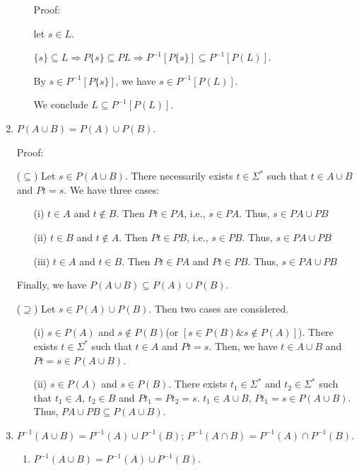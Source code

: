 \documentclass{article}
\begin{document}
\begin{enumerate}
\begin{enumerate}
    Proof:

    let $s \in L$. 

    $\{s\} \subseteq L \Rightarrow P\{s\} \subseteq PL \Rightarrow P^{-1}[P\{s\}] \subseteq P^{-1}[P(L)]$.

    By $s \in P^{-1}[P\{s\}]$, we have $s \in P^{-1}[P(L)]$. 

    We conclude $L \subseteq P^{-1}[P(L)]$.

  \end{enumerate}
  
  \item $P(A \cup B) = P(A) \cup P(B)$.
  
  Proof:
  
  ($\subseteq$) Let $s \in P(A \cup B)$. There necessarily exists $t \in \Sigma^*$ such that $t \in A \cup B$ and $Pt = s$. We have three cases:

  \begin{itemize}
    \item[(i)] $t \in A$ and $t \notin B$. Then $Pt \in PA$, i.e., $s \in PA$. Thus, $s \in PA \cup PB$
    \item[(ii)] $t \in B$ and $t \notin A$. Then $Pt \in PB$, i.e., $s \in PB$. Thus, $s \in PA \cup PB$
    \item[(iii)] $t \in A$ and $t \in B$. Then $Pt \in PA$ and $Pt \in PB$. Thus, $s \in PA \cup PB$
  \end{itemize}

  Finally, we have $P(A \cup B) \subseteq P(A) \cup P(B)$.

  ($\supseteq$) Let $s \in P(A) \cup P(B)$. Then two cases are considered.

  \begin{itemize}
    \item[(i)] $s \in P(A)$ and $s \notin P(B)$(or $[s \in P(B) \& s \notin P(A)]$). There exists $t \in \Sigma^*$ such that $t \in A$ and $Pt = s$. Then, we have $t \in A \cup B$ and $Pt = s \in P(A \cup B) $.
    \item[(ii)] $s \in P(A)$ and $s \in P(B)$. There exists $t_1 \in \Sigma^*$ and $t_2 \in \Sigma^*$ such that $t_1 \in A$, $t_2 \in B$ and $Pt_1 = Pt_2 = s$. $t_1 \in A \cup B$, $Pt_1 = s \in P(A \cup B)$. Thus, $PA \cup PB \subseteq P(A \cup B)$.
  \end{itemize}

  
  \item $P^{-1}(A \cup B) = P^{-1}(A) \cup P^{-1}(B)$; $P^{-1}(A \cap B) = P^{-1}(A) \cap P^{-1}(B)$.
  
  \begin{enumerate}
    \item $P^{-1}(A \cup B) = P^{-1}(A) \cup P^{-1}(B)$.
    

\end{enumerate}
\end{enumerate}
\end{document}
